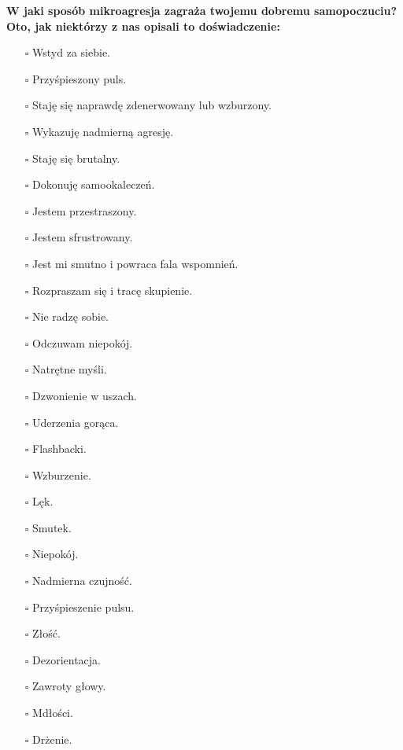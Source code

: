 \noindent\textcolor{ProcessBlue}{\textbf{\Large{W jaki sposób mikroagresja zagraża twojemu dobremu samopoczuciu?}}}\\
\textbf{\large{Oto, jak niektórzy z nas opisali to doświadczenie:}}
\begin{multicols}{2}
\begin{itemize}
\item[$\square$]{Wstyd za siebie.}
\item[$\square$]{Przyśpieszony puls.}
\item[$\square$]{Staję się naprawdę zdenerwowany lub wzburzony.}
\item[$\square$]{Wykazuję nadmierną agresję.}
\item[$\square$]{Staję się brutalny.}
\item[$\square$]{Dokonuję samookaleczeń.}
\item[$\square$]{Jestem przestraszony.}
\item[$\square$]{Jestem sfrustrowany.}
\item[$\square$]{Jest mi smutno i powraca fala wspomnień.}
\item[$\square$]{Rozpraszam się i tracę skupienie.}
\item[$\square$]{Nie radzę sobie.}
\item[$\square$]{Odczuwam niepokój.}
\item[$\square$]{Natrętne myśli.}
\item[$\square$]{Dzwonienie w uszach.}
\item[$\square$]{Uderzenia gorąca.}
\item[$\square$]{Flashbacki.}
\item[$\square$]{Wzburzenie.}
\item[$\square$]{Lęk.}
\item[$\square$]{Smutek.}
\item[$\square$]{Niepokój.}
\item[$\square$]{Nadmierna czujność.}
\item[$\square$]{Przyśpieszenie pulsu.}
\item[$\square$]{Złość.}
\item[$\square$]{Dezorientacja.}
\item[$\square$]{Zawroty głowy.}
\item[$\square$]{Mdłości.}
\item[$\square$]{Drżenie.}
\end{itemize}
\end{multicols}


